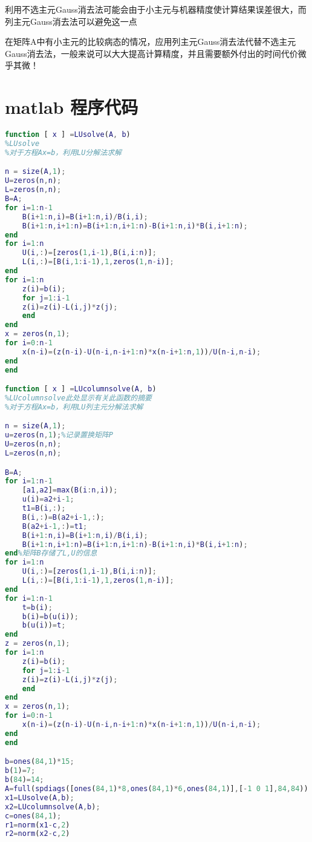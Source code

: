 \documentclass[withoutpreface,bwprint]{cumcmthesis}
\begin{document}
利用不选主元Gauss消去法可能会由于小主元与机器精度使计算结果误差很大，而列主元Gauss消去法可以避免这一点

在矩阵A中有小主元的比较病态的情况，应用列主元Gauss消去法代替不选主元Gauss消去法，一般来说可以大大提高计算精度，并且需要额外付出的时间代价微乎其微！


\section{matlab 程序代码}
\begin{lstlisting}[language=matlab]
function [ x ] =LUsolve(A, b)
%LUsolve
%对于方程Ax=b，利用LU分解法求解

n = size(A,1);
U=zeros(n,n);
L=zeros(n,n);
B=A;
for i=1:n-1
    B(i+1:n,i)=B(i+1:n,i)/B(i,i);
    B(i+1:n,i+1:n)=B(i+1:n,i+1:n)-B(i+1:n,i)*B(i,i+1:n);
end
for i=1:n
    U(i,:)=[zeros(1,i-1),B(i,i:n)];
    L(i,:)=[B(i,1:i-1),1,zeros(1,n-i)];
end
for i=1:n
    z(i)=b(i);
    for j=1:i-1
    z(i)=z(i)-L(i,j)*z(j);
    end
end
x = zeros(n,1);
for i=0:n-1
    x(n-i)=(z(n-i)-U(n-i,n-i+1:n)*x(n-i+1:n,1))/U(n-i,n-i);
end
end

function [ x ] =LUcolumnsolve(A, b)
%LUcolumnsolve此处显示有关此函数的摘要
%对于方程Ax=b，利用LU列主元分解法求解

n = size(A,1);
u=zeros(n,1);%记录置换矩阵P
U=zeros(n,n);
L=zeros(n,n);

B=A;
for i=1:n-1
    [a1,a2]=max(B(i:n,i));
    u(i)=a2+i-1;
    t1=B(i,:);
    B(i,:)=B(a2+i-1,:);
    B(a2+i-1,:)=t1;
    B(i+1:n,i)=B(i+1:n,i)/B(i,i);
    B(i+1:n,i+1:n)=B(i+1:n,i+1:n)-B(i+1:n,i)*B(i,i+1:n);
end%矩阵B存储了L,U的信息
for i=1:n
    U(i,:)=[zeros(1,i-1),B(i,i:n)];
    L(i,:)=[B(i,1:i-1),1,zeros(1,n-i)];
end
for i=1:n-1
    t=b(i);
    b(i)=b(u(i));
    b(u(i))=t;
end
z = zeros(n,1);
for i=1:n
    z(i)=b(i);
    for j=1:i-1
    z(i)=z(i)-L(i,j)*z(j);
    end
end
x = zeros(n,1);
for i=0:n-1
    x(n-i)=(z(n-i)-U(n-i,n-i+1:n)*x(n-i+1:n,1))/U(n-i,n-i);
end
end

b=ones(84,1)*15;
b(1)=7;
b(84)=14;
A=full(spdiags([ones(84,1)*8,ones(84,1)*6,ones(84,1)],[-1 0 1],84,84));
x1=LUsolve(A,b);
x2=LUcolumnsolve(A,b);
c=ones(84,1);
r1=norm(x1-c,2)
r2=norm(x2-c,2)
\end{lstlisting}
\end{document}
